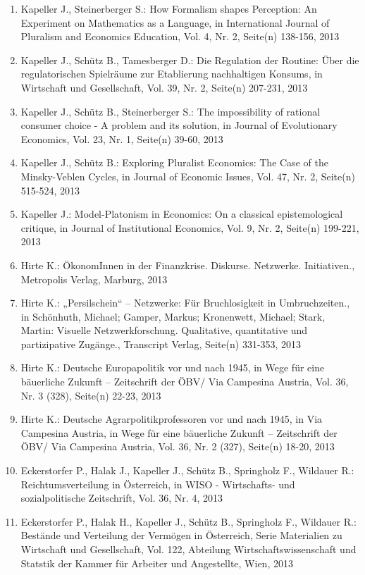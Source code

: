 \begin{enumerate}
	 \item Kapeller J., Steinerberger S.: How Formalism shapes Perception: An Experiment on Mathematics as a Language, in International Journal of Pluralism and Economics Education, Vol. 4, Nr. 2, Seite(n) 138-156, 2013
	 \item Kapeller J., Schütz B., Tamesberger D.: Die Regulation der Routine: Über die regulatorischen Spielräume zur Etablierung nachhaltigen Konsums, in Wirtschaft und Gesellschaft, Vol. 39, Nr. 2, Seite(n) 207-231, 2013
	 \item Kapeller J., Schütz B., Steinerberger S.: The impossibility of rational consumer choice - A problem and its solution, in Journal of Evolutionary Economics, Vol. 23, Nr. 1, Seite(n) 39-60, 2013
	 \item Kapeller J., Schütz B.: Exploring Pluralist Economics: The Case of the Minsky-Veblen Cycles, in Journal of Economic Issues, Vol. 47, Nr. 2, Seite(n) 515-524, 2013
	 \item Kapeller J.: Model-Platonism in Economics: On a classical epistemological critique, in Journal of Institutional Economics, Vol. 9, Nr. 2, Seite(n) 199-221, 2013
	 \item Hirte K.: ÖkonomInnen in der Finanzkrise. Diskurse. Netzwerke. Initiativen., Metropolis Verlag, Marburg, 2013
	 \item Hirte K.: „Persilschein“ – Netzwerke: Für Bruchlosigkeit in Umbruchzeiten., in Schönhuth, Michael; Gamper, Markus; Kronenwett, Michael; Stark, Martin: Visuelle Netzwerkforschung. Qualitative, quantitative und partizipative Zugänge., Transcript Verlag, Seite(n) 331-353, 2013
	 \item Hirte K.: Deutsche Europapolitik vor und nach 1945, in Wege für eine bäuerliche Zukunft – Zeitschrift der ÖBV/ Via Campesina Austria, Vol. 36, Nr. 3 (328), Seite(n) 22-23, 2013
	 \item Hirte K.: Deutsche Agrarpolitikprofessoren vor und nach 1945, in Via Campesina Austria, in Wege für eine bäuerliche Zukunft – Zeitschrift der ÖBV/ Via Campesina Austria, Vol. 36, Nr. 2 (327), Seite(n) 18-20, 2013
	 \item Eckerstorfer P., Halak J., Kapeller J., Schütz B., Springholz F., Wildauer R.: Reichtumsverteilung in Österreich, in WISO - Wirtschafts- und sozialpolitische Zeitschrift, Vol. 36, Nr. 4, 2013
	 \item Eckerstorfer P., Halak H., Kapeller J., Schütz B., Springholz F., Wildauer R.: Bestände und Verteilung der Vermögen in Österreich, Serie Materialien zu Wirtschaft und Gesellschaft, Vol. 122, Abteilung Wirtschaftswissenschaft und Statstik der Kammer für Arbeiter und Angestellte, Wien, 2013

\end{enumerate}
